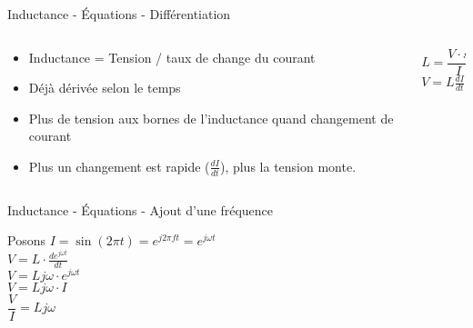 \begin{frame}{Inductance - Équations - Différentiation}
    \begin{columns}
        \begin{column}{0.5\textwidth}
            \begin{itemize}
                \item Inductance = Tension / taux de change du courant
                \item Déjà dérivée selon le temps
                \bigskip
                \item Plus de tension aux bornes de l'inductance quand changement de courant
                \item Plus un changement est rapide ($\frac{dI}{dt}$), plus la tension monte.
            \end{itemize}
        \end{column}
        \begin{column}{0.5\textwidth}
            \Large{
            \begin{center}
                $L = \dfrac{V \cdot s}{I}$\\
                \vspace{10pt}
                $V = L \frac{dI}{dt}$\\
            \end{center}
            }
        \end{column}
    \end{columns}
\end{frame}

\begin{frame}{Inductance - Équations - Ajout d'une fréquence}
    \begin{center}
        \Large{
            Posons $I = \sin(2 \pi t) = e^{j 2 \pi f t} = e^{j \omega t}$\\
            \vspace{15pt}
            $V = L \cdot \frac{de^{j \omega t}}{dt}$\\
            \vspace{5pt}
            $V = L j \omega \cdot e^{j \omega t}$\\
            \vspace{5pt}
            $V = L j \omega \cdot I$\\
            \vspace{20pt}
            $\dfrac{V}{I} = L j \omega$\\
        }
    \end{center}
\end{frame}

